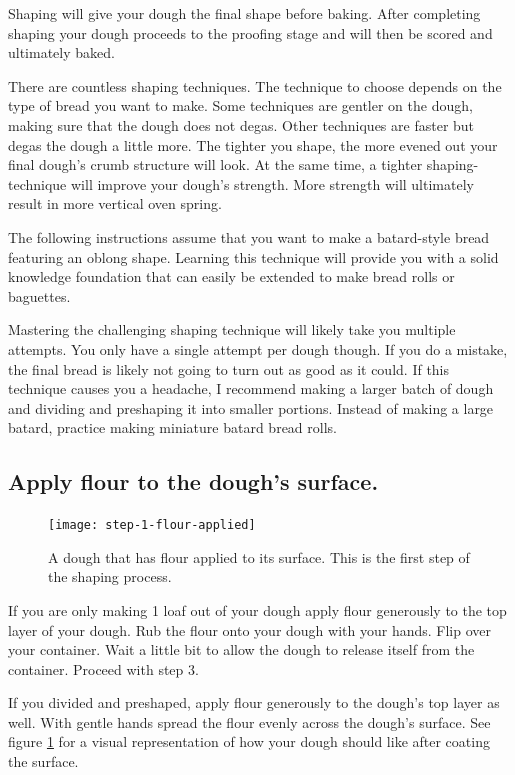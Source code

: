 Shaping will give your dough the final shape before baking. After
completing shaping your dough proceeds to the proofing stage and
will then be scored and ultimately baked.

There are countless shaping techniques. The technique to choose
depends on the type of bread you want to make. Some techniques
are gentler on the dough, making sure that the dough does not
degas. Other techniques are faster but degas the dough a little
more. The tighter you shape, the more evened out your final dough's
crumb structure will look. At the same time, a tighter shaping-technique
will improve your dough's strength. More strength will ultimately result
in more vertical oven spring.

The following instructions assume that you want to make a batard-style
bread featuring an oblong shape. Learning this technique
will provide you with a solid knowledge foundation that
can easily be extended to make bread rolls or baguettes.

Mastering the challenging shaping technique will likely take you
multiple attempts. You only have a single attempt per dough though. If you
do a mistake, the final bread is likely not going to turn out as good
as it could. If this technique causes you a headache, I recommend making
a larger batch of dough and dividing and preshaping it into
smaller portions. Instead of making a large batard, practice making miniature
batard bread rolls.

\subsection[Flouring the surface]{Apply flour to the dough's surface.}

\begin{figure}[!htb]
  \texttt{[image: step-1-flour-applied]}
  \caption{A dough that has flour applied to its surface. This is
  the first step of the shaping process.}
  \label{fig:shaping-flour-surface}
\end{figure}

If you are only making 1 loaf out of your dough apply flour
generously to the top layer of your dough. Rub the flour onto your
dough with your hands. Flip over your container. Wait a little bit
to allow the dough to release itself from the container. Proceed
with step 3.

If you divided and preshaped, apply flour generously to the dough's
top layer as well. With gentle hands spread the flour evenly across
the dough's surface. See figure \ref{fig:shaping-flour-surface} for a
visual representation of how your dough should like after coating
the surface.

